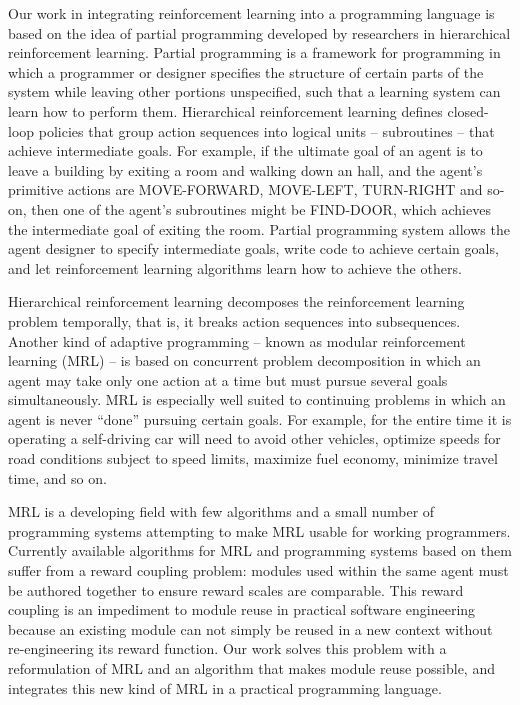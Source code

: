 Our work in integrating reinforcement learning into a programming language is based on the idea of partial programming developed by researchers in hierarchical reinforcement learning. Partial programming is a framework for programming in which a programmer or designer specifies the structure of certain parts of the system while leaving other portions unspecified, such that a learning system can learn how to perform them. Hierarchical reinforcement learning defines closed-loop policies that group action sequences into logical units -- subroutines -- that achieve intermediate goals. For example, if the ultimate goal of an agent is to leave a building by exiting a room and walking down an hall, and the agent's primitive actions are MOVE-FORWARD, MOVE-LEFT, TURN-RIGHT and so-on, then one of the agent's subroutines might be FIND-DOOR, which achieves the intermediate goal of exiting the room. Partial programming system allows the agent designer to specify intermediate goals, write code to achieve certain goals, and let reinforcement learning algorithms learn how to achieve the others.

Hierarchical reinforcement learning decomposes the reinforcement learning problem temporally, that is, it breaks action sequences into subsequences. Another kind of adaptive programming -- known as modular reinforcement learning (MRL) -- is based on concurrent problem decomposition in which an agent may take only one action at a time but must pursue several goals simultaneously. MRL is especially well suited to continuing problems in which an agent is never ``done'' pursuing certain goals. For example, for the entire time it is operating a self-driving car will need to avoid other vehicles, optimize speeds for road conditions subject to speed limits, maximize fuel economy, minimize travel time, and so on.

MRL is a developing field with few algorithms and a small number of programming systems attempting to make MRL usable for working programmers. Currently available algorithms for MRL and programming systems based on them suffer from a reward coupling problem: modules used within the same agent must be authored together to ensure reward scales are comparable. This reward coupling is an impediment to module reuse in practical software engineering because an existing module can not simply be reused in a new context without re-engineering its reward function. Our work solves this problem with a reformulation of MRL and an algorithm that makes module reuse possible, and integrates this new kind of MRL in a practical programming language.


